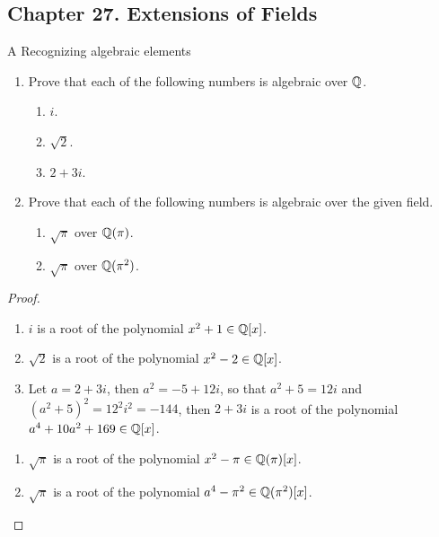 \subsection*{Chapter 27. Extensions of Fields}


\begin{exercise}{A Recognizing algebraic elements}
\begin{enumerate}
    \item Prove that each of the following numbers is algebraic over $\mathbb{Q}$.
    \begin{enumerate}
        \item  $i$.
        \item $\sqrt{2}$.
        \item $2+3i$.
    \end{enumerate}
    \item Prove that each of the following numbers is algebraic over the given field.
    \begin{enumerate}
        \item $\sqrt{\pi}$ over $\mathbb{Q}(\pi)$.
        \item $\sqrt{\pi}$ over $\mathbb{Q}(\pi^2)$.
    \end{enumerate}
\end{enumerate}
\end{exercise}
\begin{proof}
 \begin{enumerate}
     \begin{enumerate}
         \item $i$ is a root of the polynomial $x^2+1\in\mathbb{Q}[x]$.
         \item $\sqrt{2}$ is a root of the polynomial $x^2-2\in\mathbb{Q}[x]$.
         \item Let $a=2+3i$, then $a^2=-5+12i$, so that $a^2+5=12i$ and $(a^2+5)^2=12^2i^2=-144$, then $2+3i$ is a root of the polynomial $a^4+10a^2+169\in\mathbb{Q}[x]$.
     \end{enumerate}
     \begin{enumerate}
         \item $\sqrt{\pi}$ is a root of the polynomial $x^2-\pi\in\mathbb{Q}(\pi)[x]$.
         \item $\sqrt{\pi}$ is a root of the polynomial $a^4-\pi^2\in\mathbb{Q}(\pi^2)[x]$.
     \end{enumerate}
 \end{enumerate}
\end{proof}

